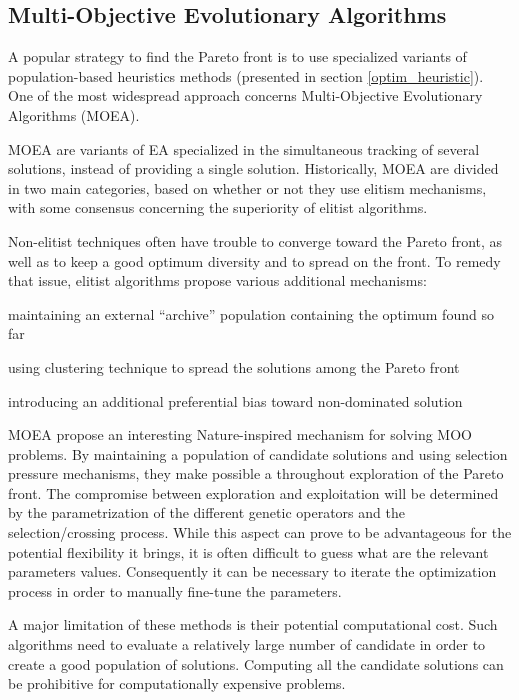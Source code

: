 \subsection{Multi-Objective Evolutionary Algorithms}

A popular strategy to find the Pareto front is to use specialized variants of population-based heuristics methods (presented in section \ref{optim_heuristic}).  One of the most widespread approach concerns Multi-Objective Evolutionary Algorithms (MOEA).

MOEA are variants of EA specialized in the simultaneous tracking of several solutions, instead of providing a single solution. Historically, MOEA are divided in two main categories, based on whether or not they use elitism mechanisms, with some consensus concerning the superiority of elitist algorithms.

Non-elitist techniques often have trouble to converge toward the Pareto front, as well as to keep a good optimum diversity and to spread on the front. To remedy that issue, elitist algorithms propose various additional mechanisms:
\begin{compactitem}
\item maintaining an external \enquote{archive} population containing the optimum found so far
\item using clustering technique to spread the solutions among the Pareto front
\item introducing an additional preferential bias toward non-dominated solution
\end{compactitem}

MOEA propose an interesting Nature-inspired mechanism for solving MOO problems. By maintaining a population of candidate solutions and using selection pressure mechanisms, they make possible a throughout exploration of the Pareto front. The compromise between exploration and exploitation will be determined by the parametrization of the different genetic operators and the selection/crossing process. While this aspect can prove to be advantageous for the potential flexibility it brings, it is often difficult to guess what are the relevant parameters values. Consequently it can be necessary to iterate the optimization process in order to manually fine-tune the parameters.

A major limitation of these methods is their potential computational cost. Such algorithms need to evaluate a relatively large number of candidate in order to create a good population of solutions. Computing all the candidate solutions can be prohibitive for computationally expensive problems.

